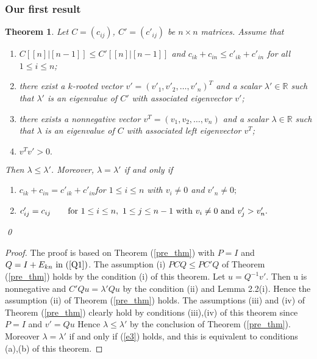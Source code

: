 \documentclass{beamer}
\theoremstyle{plain}
\newtheorem{thm}{Theorem}[section]
\theoremstyle{definition}
\begin{document}

    \frametitle{ Our first result}

\begin{thm}\label{thm_main}
    Let $C=(c_{ij})$, $C'=(c'_{ij})$ be  $n\times n$ matrices.
Assume that
\begin{enumerate}
\item[(i)]   $C[[n]|[n-1]]\leq C'[[n]|[n-1]]$ and $c_{ik}+c_{in}\leq c'_{ik}+c'_{in}$ for all $1\leq i\leq n$;
\item[(ii)] there exist a $k$-rooted vector $v'=(v'_1, v'_2, \ldots, v'_n)^T$ and a scalar $\lambda'\in \mathbb{R}$
such that $\lambda'$ is an eigenvalue of $C'$ with associated eigenvector $v'$;
\item[(iii)] there exists a nonnegative vector $v^T=(v_1, v_2, \ldots, v_n)$ and a scalar $\lambda\in \mathbb{R}$ such that $\lambda$ is an eigenvalue of $C$ with associated left eigenvector $v^T$;
\item[(iv)] $v^Tv'>0.$
\end{enumerate}
 Then $\lambda\leq \lambda'$.
Moreover, $\lambda=\lambda'$
if and only if
\begin{enumerate}
\item[(a)] $c_{ik}+c_{in}=c'_{ik}+c'_{in}$\qquad for $1\leq i\leq n$ with $v_i\not=0$ and $v'_n\not=0;$
\item[(b)]
$c'_{ij}=c_{ij}\qquad \hbox{for~}1\leq i\leq n,~1\leq j\leq n-1 \hbox{~with~} v_i\ne 0 \hbox{~and~} v'_j> v'_n.$
\end{enumerate} \qed
\end{thm}



   
    \begin{proof}
        The proof is based on Theorem (\ref{pre_thm}) with $P = I$ and $Q = I + E_{kn} \text{ in } (\ref{Q1})  $.%
        The assumption (i) $PCQ\leq PC'Q$ of Theorem (\ref{pre_thm}) holds by the condition (i) of this theorem. 
        Let $u = Q^{-1}v'$. Then u is nonnegative and $C'Qu = \lambda' Qu$ by the condition (ii) and 
        Lemma 2.2(i). Hence the assumption (ii) of Theorem (\ref{pre_thm}) holds. The assumptions (iii) and (iv) 
        of Theorem (\ref{pre_thm}) clearly hold by conditions (iii),(iv) of this theorem since $P = I$ and $v'= Qu$  
        Hence $\lambda \leq \lambda' $ by the conclusion of Theorem (\ref{pre_thm}). Moreover $\lambda = \lambda'$ 
        if and only if (\ref{e3}) holds, and this is equivalent to conditions (a),(b) of this theorem. 
        \end{proof}   
    
\end{document}
